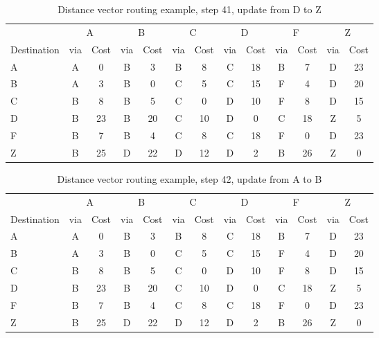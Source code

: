 \begin{table}
    \caption{Distance vector  routing example, step 41, update from D to Z }
    \label{tab:dv:step:41}
\begin{tabular}{l|c|c|c|c|c|c|c|c|c|c|c|c}
    \toprule
      & \multicolumn{2}{c|}{A}&\multicolumn{2}{c|}{B}&\multicolumn{2}{c|}{C}&\multicolumn{2}{c|}{D}&\multicolumn{2}{c|}{F}&\multicolumn{2}{c|}{Z} \\
    Destination & via&Cost&via&Cost&via&Cost&via&Cost&via&Cost&via&Cost \\ 
    \midrule
    A & A & 0 &B & 3 &B & 8 &C & 18 &B & 7 &D & 23 
 \\B & A & 3 &B & 0 &C & 5 &C & 15 &F & 4 &D & 20 
 \\C & B & 8 &B & 5 &C & 0 &D & 10 &F & 8 &D & 15 
 \\D & B & 23 &B & 20 &C & 10 &D & 0 &C & 18 &Z & 5 
 \\F & B & 7 &B & 4 &C & 8 &C & 18 &F & 0 &D & 23 
 \\Z & B & 25 &D & 22 &D & 12 &D & 2 &B & 26 &Z & 0 
    \\ \bottomrule 
\end{tabular}
\end{table}
    

\begin{table}
    \caption{Distance vector  routing example, step 42, update from A to B }
    \label{tab:dv:step:42}
\begin{tabular}{l|c|c|c|c|c|c|c|c|c|c|c|c}
    \toprule
      & \multicolumn{2}{c|}{A}&\multicolumn{2}{c|}{B}&\multicolumn{2}{c|}{C}&\multicolumn{2}{c|}{D}&\multicolumn{2}{c|}{F}&\multicolumn{2}{c|}{Z} \\
    Destination & via&Cost&via&Cost&via&Cost&via&Cost&via&Cost&via&Cost \\ 
    \midrule
    A & A & 0 &B & 3 &B & 8 &C & 18 &B & 7 &D & 23 
 \\B & A & 3 &B & 0 &C & 5 &C & 15 &F & 4 &D & 20 
 \\C & B & 8 &B & 5 &C & 0 &D & 10 &F & 8 &D & 15 
 \\D & B & 23 &B & 20 &C & 10 &D & 0 &C & 18 &Z & 5 
 \\F & B & 7 &B & 4 &C & 8 &C & 18 &F & 0 &D & 23 
 \\Z & B & 25 &D & 22 &D & 12 &D & 2 &B & 26 &Z & 0 
    \\ \bottomrule 
\end{tabular}
\end{table}
    

